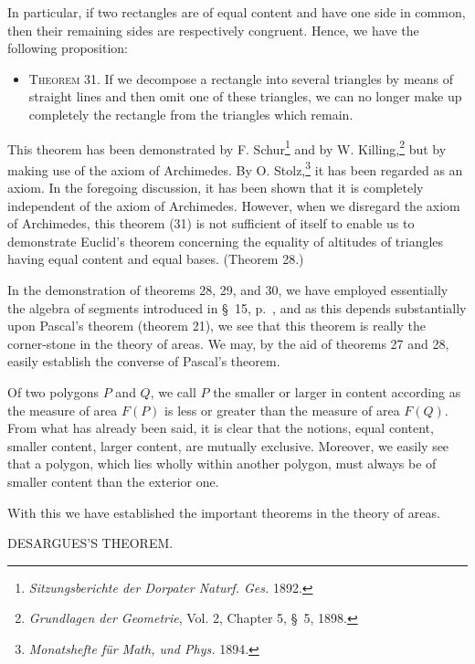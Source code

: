 \documentclass[11pt,oneside]{book}
\begin{document}
In particular, if two rectangles are of equal content
and have one side in common, then their remaining
sides are respectively congruent. Hence, we have the
following proposition:

\begin{itemize}
\item[]{\scshape Theorem 31.} If we decompose a rectangle into
several triangles by means of straight lines and
then omit one of these triangles, we can no
longer make up completely the rectangle from
the triangles which remain.
\end{itemize}

This theorem has been demonstrated by F. Schur\footnote{\textit{Sitzungsberichte
der Dorpater Naturf. Ges.} 1892.}
and by W. Killing,\footnote{\textit{Grundlagen der Geometrie},
Vol. 2, Chapter 5, \S~5, 1898.}
but by making use of the axiom
of Archimedes. By O. Stolz,\footnote{\textit{Monatshefte f\"ur Math, und Phys.} 1894.}
it has been regarded
as an axiom. In the foregoing discussion, it has been
shown that it is completely independent of the axiom
of Archimedes. However, when we disregard the axiom
of Archimedes, this theorem (31) is not sufficient
of itself to enable us to demonstrate Euclid's theorem
concerning the equality of altitudes of triangles
having equal content and equal bases. (Theorem 28.)

In the demonstration of theorems 28, 29, and 30,
we have employed essentially the algebra of segments
introduced in \S~15, p.~\pageref{folio46}, and as this depends substantially
upon Pascal's theorem (theorem 21), we see
that this theorem is really the corner-stone in the theory
of areas. We may, by the aid of theorems 27 and
28, easily establish the converse of Pascal's theorem.

Of two polygons $P$ and $Q$, we call $P$ the smaller
or larger in content according as the measure of area
\label{folio70}
$F(P)$ is less or greater than the measure of area $F(Q)$.
From what has already been said, it is clear that the
notions, equal content, smaller content, larger content,
are mutually exclusive. Moreover, we easily see
that a polygon, which lies wholly within another polygon,
must always be of smaller content than the exterior
one.

With this we have established the important theorems
in the theory of areas.
\newpage
\begin{center}{\Large DESARGUES'S THEOREM.}\end{center}
\label{p22}
\end{document}

